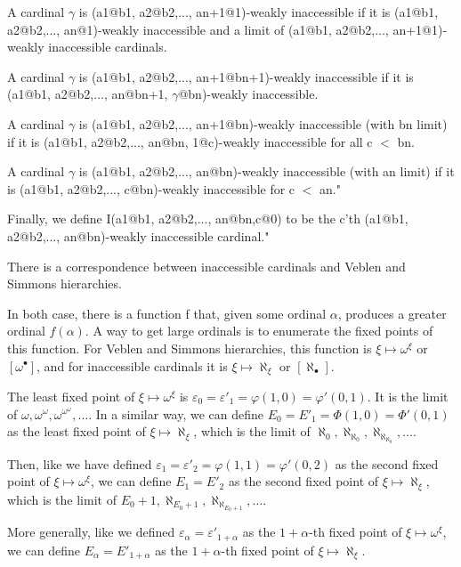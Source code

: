 \documentclass[10pt]{article}
\begin{document}
A cardinal \(\gamma\) is (a1@b1, a2@b2,..., an+1@1)-weakly inaccessible if it is (a1@b1, a2@b2,..., an@1)-weakly inaccessible and a limit of (a1@b1, a2@b2,..., an+1@1)-weakly inaccessible cardinals.

A cardinal \(\gamma\) is (a1@b1, a2@b2,..., an+1@bn+1)-weakly inaccessible if it is (a1@b1, a2@b2,..., an@bn+1, \(\gamma\)@bn)-weakly inaccessible.

A cardinal \(\gamma\) is (a1@b1, a2@b2,..., an+1@bn)-weakly inaccessible (with bn limit) if it is (a1@b1, a2@b2,..., an@bn, 1@c)-weakly inaccessible for all c \(<\) bn.

A cardinal \(\gamma\) is (a1@b1, a2@b2,..., an@bn)-weakly inaccessible (with an limit) if it is (a1@b1, a2@b2,..., c@bn)-weakly inaccessible for c \(<\) an."

\bigskip

Finally, we define I(a1@b1, a2@b2,..., an@bn,c@0) to be the c'th (a1@b1, a2@b2,..., an@bn)-weakly inaccessible cardinal."

\bigskip

There is a correspondence between inaccessible cardinals and Veblen and Simmons hierarchies.

In both case, there is a function f that, given some ordinal \( \alpha \), produces a greater ordinal \( f(\alpha) \). A way to get large ordinals is to enumerate the fixed points of this function. For Veblen and Simmons hierarchies, this function is \( \xi \mapsto \omega^\xi \) or \( [\omega^\bullet] \), and for inaccessible cardinals it is \( \xi \mapsto \aleph_\xi \) or \( [\aleph_\bullet] \). 

The least fixed point of \( \xi \mapsto \omega^\xi \) is \( \varepsilon_0 =  \varepsilon'_1 = \varphi(1,0) = \varphi'(0,1) \). It is the limit of \( \omega, \omega^\omega, \omega^{\omega^\omega}, \ldots \). In a similar way, we can define \( E_0 = E'_1 = \Phi(1,0) = \Phi'(0,1) \) as the least fixed point of \( \xi \mapsto \aleph_\xi \), which is the limit of \( \aleph_0, \aleph_{\aleph_0}, \aleph_{\aleph_{\aleph_0}}, \ldots \).

Then, like we have defined \( \varepsilon_1 = \varepsilon'_2 = \varphi(1,1) = \varphi'(0,2) \) as the second fixed point of \( \xi \mapsto \omega^\xi \), we can define \( E_1 = E'_2 \) as the second fixed point of \( \xi \mapsto \aleph_\xi \), which is the limit of \( E_0+1, \aleph_{E_0+1}, \aleph_{\aleph_{E_0+1}}, \ldots \).

More generally, like we defined \( \varepsilon_\alpha = \varepsilon'_{1+\alpha} \) as the \(1+\alpha\)-th fixed point of \( \xi \mapsto \omega^\xi \), we can define \( E_\alpha = E'_{1+\alpha} \) as the \(1+\alpha\)-th fixed point of \( \xi \mapsto \aleph_\xi \).
\end{document}
